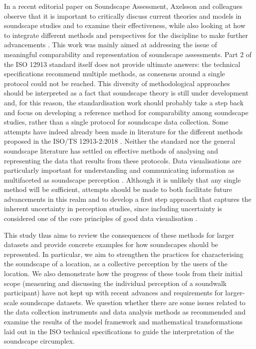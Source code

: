 \documentclass[
  authoryear,
  preprint,
  3p]{elsarticle}
\begin{document}
In a recent editorial paper on Soundscape Assessment, Axelsson and
colleagues observe that it is important to critically discuss current
theories and models in soundscape studies and to examine their
effectiveness, while also looking at how to integrate different methods
and perspectives for the discipline to make further advancements
\citep{Axelsson2019editorial}. This work was mainly aimed at addressing
the issue of meaningful comparability and representation of soundscape
assessments. Part 2 of the ISO 12913 standard itself does not provide
ultimate answers: the technical specifications recommend multiple
methods, as consensus around a single protocol could not be reached.
This diversity of methodological approaches should be interpreted as a
fact that soundscape theory is still under development and, for this
reason, the standardisation work should probably take a step back and
focus on developing a reference method for comparability among
soundscape studies, rather than a single protocol for soundscape data
collection. Some attempts have indeed already been made in literature
for the different methods proposed in the ISO/TS 12913-2:2018
\citep[\citet{jo2020soundscape}]{aletta2019exploring}. Neither the
standard nor the general soundscape literature has settled on effective
methods of analysing and representing the data that results from these
protocols. Data visualisations are particularly important for
understanding and communicating information as multifaceted as
soundscape perception \citep{tufte2001visual}. Although it is unlikely
that any single method will be sufficient, attempts should be made to
both facilitate future advancements in this realm and to develop a first
step approach that captures the inherent uncertainty in perception
studies, since including uncertainty is considered one of the core
principles of good data visualisation \citep{Midway2020Principles}.

This study thus aims to review the consequences of these methods for
larger datasets and provide concrete examples for how soundscapes should
be represented. In particular, we aim to strengthen the practices for
characterising the soundscape of a location, as a collective perception
by the users of the location. We also demonstrate how the progress of
these tools from their initial scope (measuring and discussing the
individual perception of a soundwalk participant) have not kept up with
recent advances and requirements for larger-scale soundscape datasets.
We question whether there are some issues related to the data collection
instruments and data analysis methods as recommended and examine the
results of the model framework and mathematical transformations laid out
in the ISO technical specifications to guide the interpretation of the
soundscape circumplex.
\end{document}
